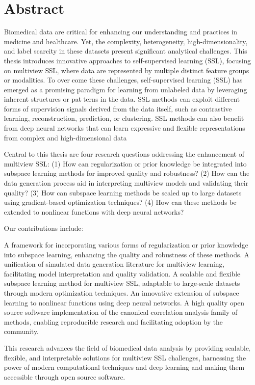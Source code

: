 \chapter*{Abstract} %

Biomedical data are critical for enhancing our understanding and practices in medicine and healthcare. Yet, the complexity, heterogeneity, high-dimensionality, and label scarcity in these datasets present significant analytical challenges. This thesis introduces innovative approaches to self-supervised learning (SSL), focusing on multiview SSL, where data are represented by multiple distinct feature groups or modalities. To overcome these challenges, self-supervised learning (SSL) has emerged as a promising
paradigm for learning from unlabeled data by leveraging inherent structures or patterns in the data. SSL methods can exploit different forms of supervision signals
derived from the data itself, such as contrastive learning, reconstruction, prediction,
or clustering. SSL methods can also benefit from deep neural networks that can
learn expressive and flexible representations from complex and high-dimensional
data

Central to this thesis are four research questions addressing the enhancement of multiview SSL: (1) How can regularization or prior knowledge be integrated into subspace learning methods for improved quality and robustness? (2) How can the data generation process aid in interpreting multiview models and validating their quality? (3) How can subspace learning methods be scaled up to large datasets using gradient-based optimization techniques? (4) How can these methods be extended to nonlinear functions with deep neural networks?

Our contributions include:

A framework for incorporating various forms of regularization or prior knowledge into subspace learning, enhancing the quality and robustness of these methods. A unification of simulated data generation literature for multiview learning, facilitating model interpretation and quality validation. A scalable and flexible subspace learning method for multiview SSL, adaptable to large-scale datasets through modern optimization techniques. An innovative extension of subspace learning to nonlinear functions using deep neural networks. A high quality open source software implementation of the canonical correlation analysis family of methods, enabling reproducible research and facilitating adoption by the community.

This research advances the field of biomedical data analysis by providing scalable, flexible, and interpretable solutions for multiview SSL challenges, harnessing the power of modern computational techniques and deep learning and making them accessible through open source software.